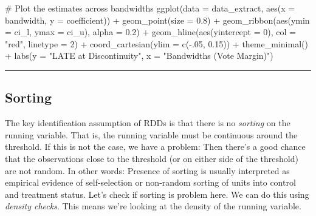 \documentclass[
  letterpaper,
  DIV=11,
  numbers=noendperiod]{scrreprt}
\newenvironment{Shaded}{\begin{snugshade}}{\end{snugshade}}
\newcommand{\AttributeTok}[1]{\textcolor[rgb]{0.40,0.45,0.13}{#1}}
\newcommand{\CommentTok}[1]{\textcolor[rgb]{0.37,0.37,0.37}{#1}}
\newcommand{\DecValTok}[1]{\textcolor[rgb]{0.68,0.00,0.00}{#1}}
\newcommand{\FloatTok}[1]{\textcolor[rgb]{0.68,0.00,0.00}{#1}}
\newcommand{\FunctionTok}[1]{\textcolor[rgb]{0.28,0.35,0.67}{#1}}
\newcommand{\NormalTok}[1]{\textcolor[rgb]{0.00,0.23,0.31}{#1}}
\newcommand{\SpecialCharTok}[1]{\textcolor[rgb]{0.37,0.37,0.37}{#1}}
\newcommand{\StringTok}[1]{\textcolor[rgb]{0.13,0.47,0.30}{#1}}
\begin{document}
\begin{Shaded}
\begin{Highlighting}[]
\CommentTok{\# Plot the estimates across bandwidths}
\FunctionTok{ggplot}\NormalTok{(}\AttributeTok{data =}\NormalTok{ data\_extract,}
       \FunctionTok{aes}\NormalTok{(}\AttributeTok{x =}\NormalTok{ bandwidth, }\AttributeTok{y =}\NormalTok{ coefficient)) }\SpecialCharTok{+}
  \FunctionTok{geom\_point}\NormalTok{(}\AttributeTok{size =} \FloatTok{0.8}\NormalTok{) }\SpecialCharTok{+}
  \FunctionTok{geom\_ribbon}\NormalTok{(}\FunctionTok{aes}\NormalTok{(}\AttributeTok{ymin =}\NormalTok{ ci\_l, }\AttributeTok{ymax =}\NormalTok{ ci\_u), }\AttributeTok{alpha =} \FloatTok{0.2}\NormalTok{) }\SpecialCharTok{+}
  \FunctionTok{geom\_hline}\NormalTok{(}\FunctionTok{aes}\NormalTok{(}\AttributeTok{yintercept =} \DecValTok{0}\NormalTok{), }\AttributeTok{col =} \StringTok{"red"}\NormalTok{, }\AttributeTok{linetype =} \DecValTok{2}\NormalTok{) }\SpecialCharTok{+}
  \FunctionTok{coord\_cartesian}\NormalTok{(}\AttributeTok{ylim =} \FunctionTok{c}\NormalTok{(}\SpecialCharTok{{-}}\NormalTok{.}\DecValTok{05}\NormalTok{, }\FloatTok{0.15}\NormalTok{)) }\SpecialCharTok{+}
  \FunctionTok{theme\_minimal}\NormalTok{() }\SpecialCharTok{+}
  \FunctionTok{labs}\NormalTok{(}\AttributeTok{y =} \StringTok{"LATE at Discontinuity"}\NormalTok{, }\AttributeTok{x =} \StringTok{"Bandwidths (Vote Margin)"}\NormalTok{)}
\end{Highlighting}
\end{Shaded}

\hfill\break

\begin{center}\rule{0.5\linewidth}{0.5pt}\end{center}

\hypertarget{sorting}{%
\subsection{Sorting}\label{sorting}}

The key identification assumption of RDDs is that there is no
\emph{sorting} on the running variable. That is, the running variable
must be continuous around the threshold. If this is not the case, we
have a problem: Then there's a good chance that the observations close
to the threshold (or on either side of the threshold) are not random. In
other words: Presence of sorting is usually interpreted as empirical
evidence of self-selection or non-random sorting of units into control
and treatment status. Let's check if sorting is problem here. We can do
this using \emph{density checks}. This means we're looking at the
density of the running variable.\\
\end{document}
